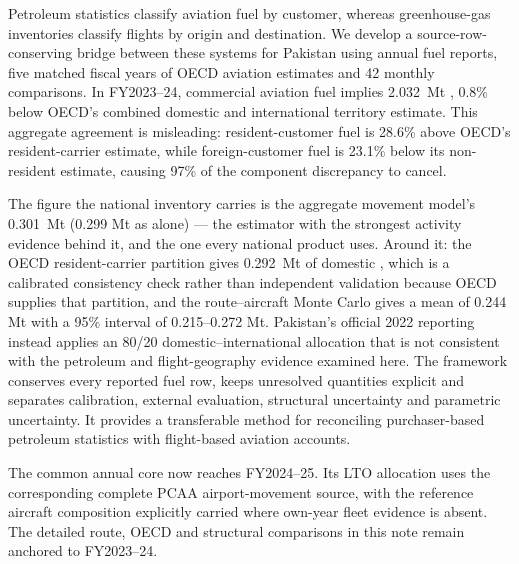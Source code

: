 Petroleum statistics classify aviation fuel by customer, whereas greenhouse-gas inventories
classify flights by origin and destination. We develop a source-row-conserving bridge between
these systems for Pakistan using annual fuel reports, five matched fiscal years of OECD
aviation estimates and 42 monthly comparisons. In FY2023--24, commercial aviation fuel implies
\SI{2.032}{\mega\tonne} \COtwo{}, 0.8\% below OECD's combined domestic and international
territory estimate. This aggregate agreement is misleading: resident-customer fuel is 28.6\%
above OECD's resident-carrier estimate, while foreign-customer fuel is 23.1\% below its
non-resident estimate, causing 97\% of the component discrepancy to cancel.

The figure the national inventory carries is the aggregate movement model's
\SI{0.301}{\mega\tonne} \COe{} (0.299 Mt as \COtwo{} alone) --- the estimator with the
strongest activity evidence behind it, and the one every national product uses. Around it:
the OECD resident-carrier partition gives \SI{0.292}{\mega\tonne} of domestic \COtwo{},
which is a calibrated consistency check rather than independent validation because OECD
supplies that partition, and the route--aircraft Monte Carlo gives a mean of 0.244 Mt
\COtwo{} with a 95\% interval of 0.215--0.272 Mt. Pakistan's official 2022 reporting instead applies an 80/20
domestic--international allocation that is not consistent with the petroleum and
flight-geography evidence examined here. The framework conserves every reported fuel row,
keeps unresolved quantities explicit and separates calibration, external evaluation,
structural uncertainty and parametric uncertainty. It provides a transferable method for
reconciling purchaser-based petroleum statistics with flight-based aviation accounts.

The common annual core now reaches FY2024--25. Its LTO allocation uses the corresponding complete PCAA airport-movement source, with the reference aircraft composition explicitly carried where own-year fleet evidence is absent. The detailed route, OECD and structural comparisons in this note remain anchored to FY2023--24.
